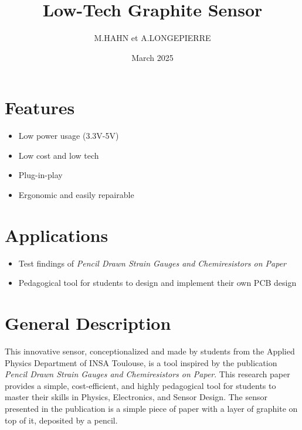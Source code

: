 \documentclass[10pt]{datasheet}
\title{Low-Tech Graphite Sensor}
\author{M.HAHN et A.LONGEPIERRE}
\date{March 2025}
\begin{document}
\maketitle


\section{Features}

\begin{itemize}
\item{Low power usage (3.3V-5V)}
\item{Low cost and low tech}
\item{Plug-in-play}
\item{Ergonomic and easily repairable}
\end{itemize}

\section{Applications}

\begin{itemize}
\item{Test findings of \it{Pencil Drawn Strain Gauges and Chemiresistors on Paper}\footnotemark{}}
\item{Pedagogical tool for students to design and implement their own PCB design}
\end{itemize}

\section{General Description}
This innovative sensor, conceptionalized and made by students from the Applied Physics Department of INSA Toulouse, is a tool inspired by the publication 
\textit{Pencil Drawn Strain Gauges and Chemiresistors on Paper}\footnotemark[\value{footnote}]. This research paper provides a simple, cost-efficient, and highly pedagogical tool for students 
to master their skills in Physics, Electronics, and Sensor Design. The sensor presented in the publication is a simple piece of paper with a layer of graphite 
on top of it, deposited by a pencil. 
\end{document}
